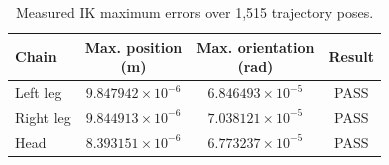 \begin{table}[H]
\centering
\small
\setlength{\tabcolsep}{10pt}
\caption{Measured IK maximum errors over 1,515 trajectory poses.}
\label{tab:ik}
\medskip
\begin{tabular}{lccc}
\toprule
Chain & \shortstack{Max. position\\(m)} & \shortstack{Max. orientation\\(rad)} & Result \\
\midrule
Left leg & $9.847942\times 10^{-6}$ & $6.846493\times 10^{-5}$ & PASS \\
Right leg & $9.844913\times 10^{-6}$ & $7.038121\times 10^{-5}$ & PASS \\
Head & $8.393151\times 10^{-6}$ & $6.773237\times 10^{-5}$ & PASS \\
\bottomrule
\end{tabular}
\end{table}
